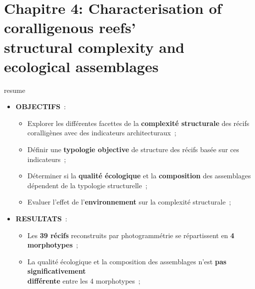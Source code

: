 \chapter[Characterisation of coralligenous reefs’ structural complexity and ecological assemblages]{Chapitre 4: Characterisation of coralligenous reefs’ \\structural complexity and ecological assemblages} \label{chapitre4-structure}

\pagestyle{main}



\setlength{\fboxsep}{8pt}
\setlength{\fboxrule}{0pt}
\begin{center}
\begin{colbox}{resume}
  \vspace{-2pt}
{\color{textresume}\small
\begin{itemize}[leftmargin=0in]\itemsep3pt
\item \textbf{OBJECTIFS}~:
    \begin{itemize}
      \item Explorer les différentes facettes de la \textbf{complexité structurale} des récifs coralligènes avec des indicateurs architecturaux~;
      \item Définir une \textbf{typologie objective} de structure des récifs basée sur ces indicateurs~;
      \item Déterminer si la \textbf{qualité écologique} et la \textbf{composition} des assemblages dépendent de la typologie structurelle~;
      \item Evaluer l'effet de l'\textbf{environnement} sur la complexité structurale~;
    \end{itemize}
\item \textbf{RESULTATS}~:
    \begin{itemize}
      \item Les \textbf{39 récifs} reconstruits par photogrammétrie se répartissent en \textbf{4 morphotypes}~;
      \item La qualité écologique et la composition des assemblages n'est \textbf{pas significativement\\ différente} entre les 4 morphotypes~;
    \end{itemize}
\end{itemize}
}
\vspace{-2pt}
\end{colbox}
\end{center}

